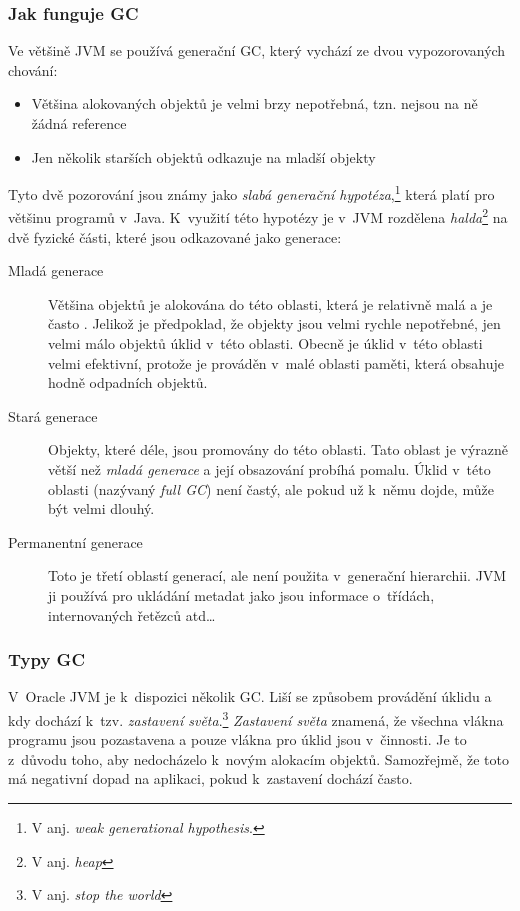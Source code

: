 \subsubsection{Jak funguje GC}
Ve většině JVM se používá generační GC, který vychází ze dvou vypozorovaných chování:
\begin{itemize}
  \item Většina alokovaných objektů je velmi brzy nepotřebná, tzn. nejsou na ně žádná reference
  \item Jen několik starších objektů odkazuje na mladší objekty
\end{itemize}
Tyto dvě pozorování jsou známy jako \emph{slabá generační hypotéza}\cite{hunt2011java},\footnote{V anj. \emph{weak generational hypothesis}.} která platí pro většinu programů v~Java.
K~využití této hypotézy je v~JVM rozdělena \emph{halda}\footnote{V anj. \emph{heap}} na dvě fyzické části, které jsou odkazované jako generace:

\begin{description}
  \item[Mladá generace] Většina objektů je alokována do této oblasti, která je relativně malá a je často .
Jelikož je předpoklad, že objekty jsou velmi rychle nepotřebné, jen velmi málo objektů  úklid v~této oblasti.
Obecně je úklid v~této oblasti velmi efektivní, protože je prováděn v~malé oblasti paměti, která obsahuje hodně odpadních objektů.

  \item[Stará generace] Objekty, které  déle, jsou promovány do této oblasti.
Tato oblast je výrazně větší než \emph{mladá generace} a její obsazování probíhá pomalu.
Úklid v~této oblasti (nazývaný \emph{full GC}) není častý, ale pokud už k~němu dojde, může být velmi dlouhý.

  \item[Permanentní generace] Toto je třetí oblastí generací, ale není použita v~generační hierarchii.
JVM ji používá pro ukládání metadat jako jsou informace o~třídách, internovaných řetězců atd\ldots
\end{description}

\subsubsection{Typy GC\label{subsub:gctypes}}

V~Oracle JVM je k~dispozici několik GC. Liší se způsobem provádění úklidu a kdy dochází k~tzv. \emph{zastavení světa}.\footnote{V anj. \emph{stop the world}}
\emph{Zastavení světa} znamená, že všechna vlákna programu jsou pozastavena a pouze vlákna pro úklid jsou v~činnosti.
Je to z~důvodu toho, aby nedocházelo k~novým alokacím objektů.
Samozřejmě, že toto má negativní dopad na aplikaci, pokud k~zastavení dochází často.

